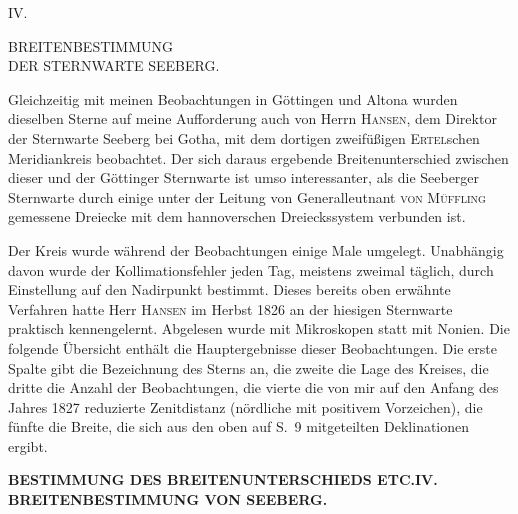\begingroup
\setlength{\abovedisplayskip}{7pt}
\setlength{\belowdisplayskip}{7pt}
\setlength{\abovedisplayshortskip}{3pt}
\setlength{\belowdisplayshortskip}{4pt}

\par\clearpage

\vspace*{.19\textheight}
\begin{center}
{\large IV.}\par\medskip
{\Large BREITENBESTIMMUNG\\DER STERNWARTE SEEBERG.}
\end{center}

Gleichzeitig mit meinen Beobachtungen in Göttingen und Altona wurden
dieselben Sterne auf meine Aufforderung auch von Herrn \textsc{Hansen}, dem Direktor
der Sternwarte Seeberg bei Gotha, mit dem dortigen zweifüßigen \textsc{Ertel}schen
Meridiankreis beobachtet. Der sich daraus ergebende Breitenunterschied zwischen
dieser und der Göttinger Sternwarte ist umso interessanter, als die Seeberger
Sternwarte durch einige unter der Leitung von Generalleutnant \textsc{von Müffling}
gemessene Dreiecke mit dem hannoverschen Dreieckssystem verbunden ist.

Der Kreis wurde während der Beobachtungen einige Male umgelegt. Unabhängig davon
wurde der Kollimationsfehler jeden Tag, meistens zweimal täglich, durch Einstellung
auf den Nadirpunkt bestimmt. Dieses bereits oben erwähnte Verfahren hatte Herr
\textsc{Hansen} im Herbst 1826 an der hiesigen Sternwarte praktisch kennengelernt.
Abgelesen wurde mit Mikroskopen statt mit Nonien. Die folgende Übersicht enthält
die Hauptergebnisse dieser Beobachtungen. Die erste Spalte gibt die Bezeichnung des
Sterns an, die zweite die Lage des Kreises, die dritte die Anzahl der Beobachtungen,
die vierte die von mir auf den Anfang des Jahres 1827 reduzierte Zenitdistanz
(nördliche mit positivem Vorzeichen), die fünfte die Breite, die sich aus den oben
auf S.~9 mitgeteilten Deklinationen ergibt.

\par\clearpage
\noindent\makebox[12mm][l]{}\parbox[t]{\dimexpr\linewidth-24mm\relax}{\centering\scriptsize\bfseries BESTIMMUNG DES BREITENUNTERSCHIEDS ETC.\quad IV. BREITENBESTIMMUNG VON SEEBERG.}\par\medskip

